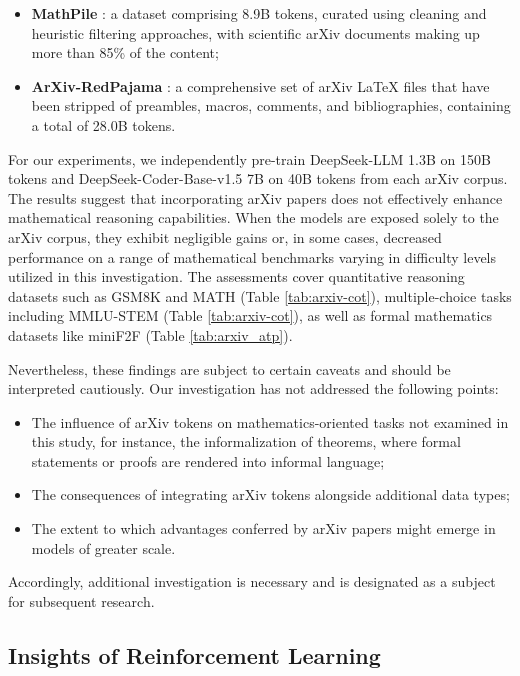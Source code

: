 \begin{itemize}[topsep=0pt]
\begin{itemize}[topsep=0pt]
    \item \textbf{MathPile} \citep{mathpile}: a dataset comprising 8.9B tokens, curated using cleaning and heuristic filtering approaches, with scientific arXiv documents making up more than 85\% of the content;
    \item \textbf{ArXiv-RedPajama} \citep{redpajama}: a comprehensive set of arXiv LaTeX files that have been stripped of preambles, macros, comments, and bibliographies, containing a total of 28.0B tokens.
\end{itemize}

For our experiments, we independently pre-train DeepSeek-LLM 1.3B on 150B tokens and DeepSeek-Coder-Base-v1.5 7B on 40B tokens from each arXiv corpus. The results suggest that incorporating arXiv papers does not effectively enhance mathematical reasoning capabilities. When the models are exposed solely to the arXiv corpus, they exhibit negligible gains or, in some cases, decreased performance on a range of mathematical benchmarks varying in difficulty levels utilized in this investigation. The assessments cover quantitative reasoning datasets such as GSM8K and MATH (Table \ref{tab:arxiv-cot}), multiple-choice tasks including MMLU-STEM (Table \ref{tab:arxiv-cot}), as well as formal mathematics datasets like miniF2F (Table \ref{tab:arxiv_atp}).

Nevertheless, these findings are subject to certain caveats and should be interpreted cautiously. Our investigation has not addressed the following points:

\begin{itemize}[topsep=0pt]
    \item The influence of arXiv tokens on mathematics-oriented tasks not examined in this study, for instance, the informalization of theorems, where formal statements or proofs are rendered into informal language;
    \item The consequences of integrating arXiv tokens alongside additional data types;
    \item The extent to which advantages conferred by arXiv papers might emerge in models of greater scale.
\end{itemize}

Accordingly, additional investigation is necessary and is designated as a subject for subsequent research.

\subsection{Insights of Reinforcement Learning}

\end{itemize}
